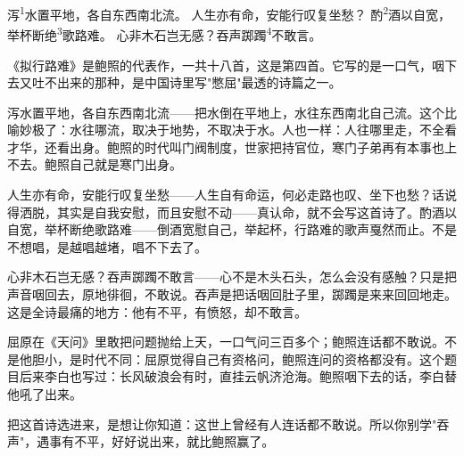 
\begin{poem}
泻\textsuperscript{1}水置平地，各自东西南北流。
人生亦有命，安能行叹复坐愁？
酌\textsuperscript{2}酒以自宽，举杯断绝\textsuperscript{3}歌路难。
心非木石岂无感？吞声踯躅\textsuperscript{4}不敢言。
\end{poem}

\begin{annotations}
\end{annotations}

\begin{appreciation}
《拟行路难》是鲍照的代表作，一共十八首，这是第四首。它写的是一口气，咽下去又吐不出来的那种，是中国诗里写"憋屈"最透的诗篇之一。

泻水置平地，各自东西南北流——把水倒在平地上，水往东西南北自己流。这个比喻妙极了：水往哪流，取决于地势，不取决于水。人也一样：人往哪里走，不全看才华，还看出身。鲍照的时代叫门阀制度，世家把持官位，寒门子弟再有本事也上不去。鲍照自己就是寒门出身。

人生亦有命，安能行叹复坐愁——人生自有命运，何必走路也叹、坐下也愁？话说得洒脱，其实是自我安慰，而且安慰不动——真认命，就不会写这首诗了。酌酒以自宽，举杯断绝歌路难——倒酒宽慰自己，举起杯，行路难的歌声戛然而止。不是不想唱，是越唱越堵，唱不下去了。

心非木石岂无感？吞声踯躅不敢言——心不是木头石头，怎么会没有感触？只是把声音咽回去，原地徘徊，不敢说。吞声是把话咽回肚子里，踯躅是来来回回地走。这是全诗最痛的地方：他有不平，有愤怒，却不敢言。

屈原在《天问》里敢把问题抛给上天，一口气问三百多个；鲍照连话都不敢说。不是他胆小，是时代不同：屈原觉得自己有资格问，鲍照连问的资格都没有。这个题目后来李白也写过：长风破浪会有时，直挂云帆济沧海。鲍照咽下去的话，李白替他吼了出来。

把这首诗选进来，是想让你知道：这世上曾经有人连话都不敢说。所以你别学"吞声"，遇事有不平，好好说出来，就比鲍照赢了。
\end{appreciation}
